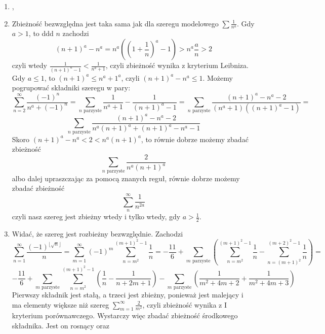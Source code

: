 \documentclass{../note}
\begin{document}
\begin{rozwiazanie}
\begin{enumerate}[label=(\alph*)]
    \[\frac{1}{(\log n)^{\log n}} > \frac{1}{(\log m)^{\log m}}\]
    Jest równoważna nierówności
    \[e^{\log\log n \cdot \log n} < e^{\log\log m \cdot \log m}\]
    która zachodzi dla $e < n < m$, bo logarytm jest rosnący, a podwójne złożenie logarytmu jest dodatnie. Zatem dla ddd $n$ ciąg, którego szereg liczymy, jest nierosnący i nieujemny, czyli możemy użyć kryterium kondensacyjnego. Możemy równie dobrze sprawdzić zbieżność takiego szeregu:
    \[\sum_{n=1}^{\infty}2^n\frac{1}{(\log 2^n)^{\log 2^n}} = \sum_{n=1}^{\infty}2^n\frac{1}{(n\log2)^{n\log2}}\]
    Możemy skorzystać z kryterium Cauchy'ego. Mamy:
    \[\lim_{n\to\infty} \sqrt[n]{\left|2^n\frac{1}{(n\log2)^{n\log2}}\right|} = \lim_{n\to\infty} \frac{2}{(n\log2)^{\log2}} = 0\]
    Zatem szereg, który badamy, jest zbieżny bezwzględnie.
    \item ,
    \item Zbieżność bezwzględna jest taka sama jak dla szeregu modelowego $\sum \frac1{n^a}$. Gdy $a > 1$, to ddd $n$ zachodzi
    \[(n+1)^a - n^a = n^a\left(\left(1+\frac1n\right)^a - 1\right) > n^a \frac{a}{n} > 2\]
    czyli wtedy $\frac{1}{(n+1)^a - 1} < \frac{1}{n^a+1}$, czyli zbieżność wynika z kryterium Leibniza. Gdy $a \leq 1$, to $(n+1)^a \leq n^a+1^a$, czyli $(n+1)^a-n^a \leq 1$. Możemy pogrupować składniki szeregu w pary:
    \[\sum_{n=2}^{\infty}\frac{(-1)^{n}}{n^{a}+(-1)^{n}} = \sum_{n \text{ parzyste}} \frac{1}{n^a+1} - \frac{1}{(n+1)^a-1} = \sum_{n \text{ parzyste}} \frac{(n+1)^a-n^a-2}{(n^a+1)((n+1)^a-1)} =\]
    \[\sum_{n \text{ parzyste}} \frac{(n+1)^a-n^a-2}{n^a(n+1)^a + (n+1)^a - n^a - 1}\]
    Skoro $(n+1)^a-n^a < 2 < n^a(n+1)^a$, to równie dobrze możemy zbadać zbieżność 
    \[\sum_{n \text{ parzyste}} \frac{2}{n^a(n+1)^a}\]
    albo dalej upraszczając za pomocą znanych reguł, równie dobrze możemy zbadać zbieżność
    \[\sum_{n}^{\infty} \frac{1}{n^{2a}}\]
    czyli nasz szereg jest zbieżny wtedy i tylko wtedy, gdy $a > \frac12$.
    \item Widać, że szereg jest rozbieżny bezwzględnie. Zachodzi
    \[\sum_{n=1}^{\infty}\frac{(-1)^{\lfloor\sqrt{n}\rfloor}}{n} = \sum_{m=1}^{\infty} (-1)^m \sum_{n=m^2}^{(m+1)^2-1} \frac1n = -\frac{11}{6} + \sum_{m \text{ parzyste}} \left(\sum_{n=m^2}^{(m+1)^2-1} \frac1n - \sum_{n=(m+1)^2}^{(m+2)^2-1} \frac1n\right) =\]
    \[-\frac{11}{6} + \sum_{m \text{ parzyste}}\sum_{n=m^2}^{(m+1)^2-1} \left(\frac1n - \frac{1}{n + 2m + 1}\right) - \sum_{m \text{ parzyste}} \left(\frac{1}{m^2+4m+2} + \frac{1}{m^2+4m+3}\right)\]
    Pierwszy składnik jest stałą, a trzeci jest zbieżny, ponieważ jest malejący i ma elementy większe niż szereg $\sum_{m=1}^{\infty}\frac{2}{m^2}$, czyli zbieżność wynika z I kryterium porównawczego. Wystarczy więc zbadać zbieżność środkowego składnika. Jest on rosnący oraz

\end{enumerate}
\end{rozwiazanie}
\end{document}
